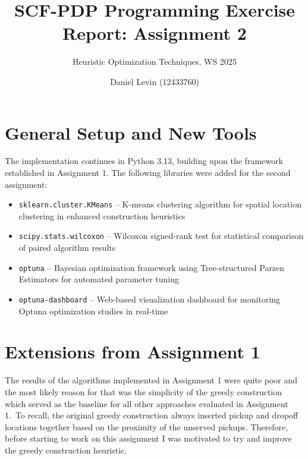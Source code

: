 \documentclass[a4paper]{scrartcl}
\title{SCF-PDP Programming Exercise Report: Assignment 2}
\subtitle{Heuristic Optimization Techniques, WS 2025}
\author{
    Daniel Levin (12433760)
}
\date{}
\begin{document}
\maketitle

\section{General Setup and New Tools}

The implementation continues in Python 3.13, building upon the framework established in Assignment 1.
The following libraries were added for the second assignment:

\begin{itemize}
  \item \texttt{sklearn.cluster.KMeans} -- K-means clustering algorithm for spatial location clustering in enhanced construction heuristics
  \item \texttt{scipy.stats.wilcoxon} -- Wilcoxon signed-rank test for statistical comparison of paired algorithm results
  \item \texttt{optuna} -- Bayesian optimization framework using Tree-structured Parzen Estimators for automated parameter tuning
  \item \texttt{optuna-dashboard} -- Web-based visualization dashboard for monitoring Optuna optimization studies in real-time
\end{itemize}

\section{Extensions from Assignment 1}
The results of the algorithms implemented in Assignment 1 were quite poor and the
most likely reason for that was the simplicity of the greedy construction which served as
the baseline for all other approaches evaluated in Assignment 1.\ To recall, the original greedy construction
always inserted pickup and dropoff locations together based on the proximity of the unserved pickups.
Therefore, before starting to work on this assignment I was motivated to try and improve the greedy construction heuristic.
\end{document}
